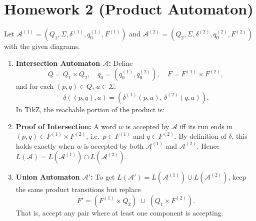 \documentclass{article}
\begin{document}
    \section*{Homework 2 (Product Automaton)}
    Let $\mathcal A^{(1)}=(Q_1,\Sigma,\delta^{(1)},q_0^{(1)},F^{(1)})$ and
    $\mathcal A^{(2)}=(Q_2,\Sigma,\delta^{(2)},q_0^{(2)},F^{(2)})$ with the given diagrams.
    
    \begin{enumerate}[1.]
      \item \textbf{Intersection Automaton $\mathcal A$:}
        Define
        \[Q=Q_1\times Q_2,\quad q_0=(q_0^{(1)},q_0^{(2)}),\quad
          F=F^{(1)}\times F^{(2)},\]
        and for each $(p,q)\in Q$, $a\in\Sigma$:
        \[\delta((p,q),a)=(\delta^{(1)}(p,a),\,\delta^{(2)}(q,a)).\]
        In TikZ, the reachable portion of the product is:
        \begin{center}
        \end{center}
    
      \item \textbf{Proof of Intersection:}
        A word $w$ is accepted by $\mathcal A$ iff its run ends in
        $(p,q)\in F^{(1)}\times F^{(2)}$, i.e.\ $p\in F^{(1)}$ and $q\in F^{(2)}$.
        By definition of $\delta$, this holds exactly when $w$ is accepted
        by both $\mathcal A^{(1)}$ and $\mathcal A^{(2)}$.  Hence
        $L(\mathcal A)=L(\mathcal A^{(1)})\cap L(\mathcal A^{(2)})$.
    
      \item \textbf{Union Automaton $\mathcal A'$:}
        To get $L(\mathcal A')=L(\mathcal A^{(1)})\cup L(\mathcal A^{(2)})$,
        keep the same product transitions but replace
        \[F'=(F^{(1)}\times Q_2)\;\cup\;(Q_1\times F^{(2)}).\]
        That is, accept any pair where at least one component is accepting.
    \end{enumerate}
    
\end{document}
